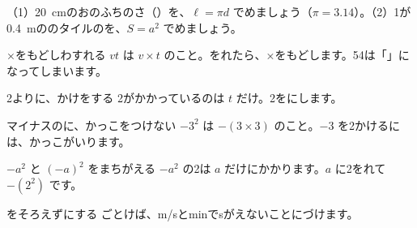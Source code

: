 \begin{jibun}
（1）\qty{20}{cm}のおのふちのさ（）を、$\ell=\pi d$ でめましょう（$\pi=3.14$）。（2）1が\qty{0.4}{m}ののタイルのを、$S=a^2$ でめましょう。
\end{jibun}


\begin{tsumazuki}{×をもどしわすれる}
$vt$ は $v\times t$ のこと。をれたら、×をもどします。54は「」になってしまいます。
\end{tsumazuki}

\begin{tsumazuki}{2よりに、かけをする}
2がかかっているのは $t$ だけ。2をにします。
\end{tsumazuki}

\begin{tsumazuki}{マイナスのに、かっこをつけない}
$-3^2$ は $-(3\times3)$ のこと。$-3$ を2かけるには、かっこがいります。
\end{tsumazuki}

\begin{tsumazuki}{$-a^2$ と $(-a)^2$ をまちがえる}
$-a^2$ の2は $a$ だけにかかります。$a$ に2をれて $-(2^2)$ です。
\end{tsumazuki}

\begin{tsumazuki}{をそろえずにする}
ごとけば、m/sとminでsがえないことにづけます。
\end{tsumazuki}

